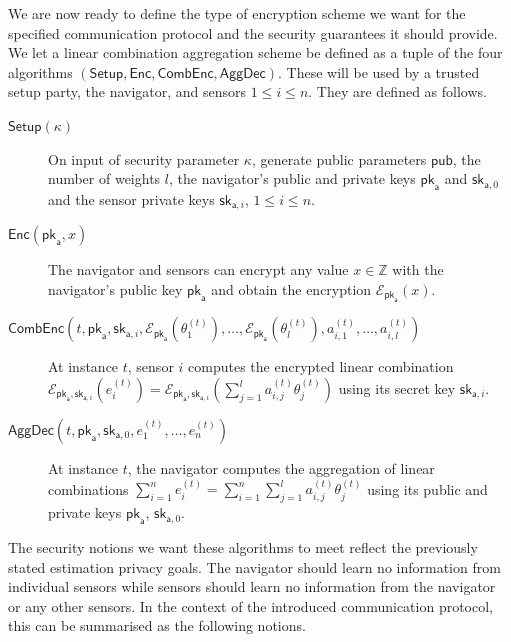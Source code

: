 We are now ready to define the type of encryption scheme we want for the specified communication protocol and the security guarantees it should provide. We let a linear combination aggregation scheme be defined as a tuple of the four algorithms $(\mathsf{Setup}, \mathsf{Enc}, \mathsf{CombEnc}, \mathsf{AggDec})$. These will be used by a trusted setup party, the navigator, and sensors $1\leq i\leq n$. They are defined as follows.
\begin{description}
    \item[$\mathsf{Setup}(\kappa)$] On input of security parameter $\kappa$, generate public parameters $\mathsf{pub}$, the number of weights $l$, the navigator's public and private keys $\mathsf{pk}_{\mathsf{a}}$ and $\mathsf{sk}_{\mathsf{a},0}$ and the sensor private keys $\mathsf{sk}_{\mathsf{a},i}$, $1\leq i\leq n$.
    \item[$\mathsf{Enc}(\mathsf{pk}_{\mathsf{a}}, x)$] The navigator and sensors can encrypt any value $x\in\mathbb{Z}$ with the navigator's public key $\mathsf{pk}_{\mathsf{a}}$ and obtain the encryption $\mathcal{E}_{\mathsf{pk}_{\mathsf{a}}}(x)$.
    \item[$\mathsf{CombEnc}(t, \mathsf{pk}_{\mathsf{a}}, \mathsf{sk}_{\mathsf{a},i}, \mathcal{E}_{\mathsf{pk}_{\mathsf{a}}}(\theta_1^{(t)}),\dots,\mathcal{E}_{\mathsf{pk}_{\mathsf{a}}}(\theta_l^{(t)}), a^{(t)}_{i,1},\dots,a^{(t)}_{i,l})$] At instance $t$, sensor $i$ computes the encrypted linear combination $\mathcal{E}_{\mathsf{pk}_{\mathsf{a}},\mathsf{sk}_{\mathsf{a},i}}(e^{(t)}_i) = \mathcal{E}_{\mathsf{pk}_{\mathsf{a}},\mathsf{sk}_{\mathsf{a},i}}(\sum^l_{j=1}a^{(t)}_{i,j}\theta^{(t)}_j)$ using its secret key $\mathsf{sk}_{\mathsf{a},i}$.
    \item[$\mathsf{AggDec}(t, \mathsf{pk}_{\mathsf{a}}, \mathsf{sk}_{\mathsf{a},0}, e^{(t)}_1,\dots,e^{(t)}_n)$] At instance $t$, the navigator computes the aggregation of linear combinations $\sum^{n}_{i=1}e_i^{(t)}=\sum^{n}_{i=1}\sum^{l}_{j=1} a^{(t)}_{i,j}\theta^{(t)}_j$ using its public and private keys $\mathsf{pk}_{\mathsf{a}}$, $\mathsf{sk}_{\mathsf{a},0}$.
\end{description}
The security notions we want these algorithms to meet reflect the previously stated estimation privacy goals. The navigator should learn no information from individual sensors while sensors should learn no information from the navigator or any other sensors. In the context of the introduced communication protocol, this can be summarised as the following notions.
